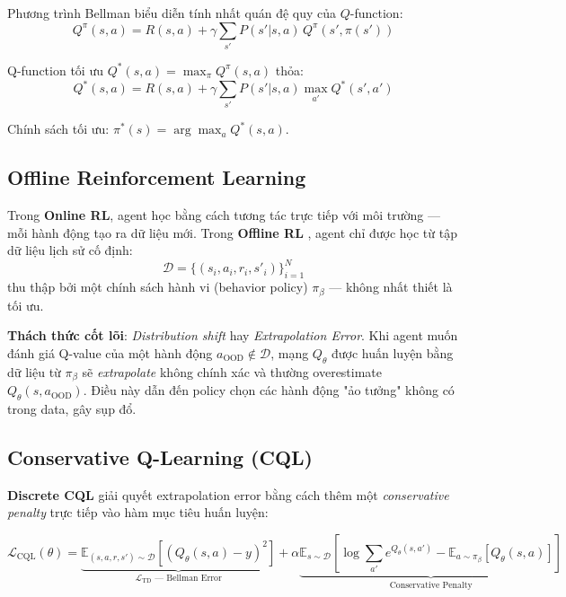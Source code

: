 Phương trình Bellman biểu diễn tính nhất quán đệ quy của $Q$-function:
\begin{equation}
    Q^\pi(s, a) = R(s, a) + \gamma \sum_{s'} P(s'|s,a)\, Q^\pi(s', \pi(s'))
    \label{eq:bellman}
\end{equation}

Q-function tối ưu $Q^*(s,a) = \max_\pi Q^\pi(s,a)$ thỏa:
\begin{equation}
    Q^*(s, a) = R(s, a) + \gamma \sum_{s'} P(s'|s,a) \max_{a'} Q^*(s', a')
\end{equation}

Chính sách tối ưu: $\pi^*(s) = \arg\max_a Q^*(s, a)$.

\subsection{Offline Reinforcement Learning}

Trong \textbf{Online RL}, agent học bằng cách tương tác trực tiếp với môi trường — mỗi hành động tạo ra dữ liệu mới. Trong \textbf{Offline RL} \cite{levine2020offline}, agent chỉ được học từ tập dữ liệu lịch sử cố định:
\begin{equation}
    \mathcal{D} = \{(s_i, a_i, r_i, s'_i)\}_{i=1}^{N}
\end{equation}
thu thập bởi một chính sách hành vi (behavior policy) $\pi_\beta$ — không nhất thiết là tối ưu.

\textbf{Thách thức cốt lõi}: \textit{Distribution shift} hay \textit{Extrapolation Error}. Khi agent muốn đánh giá Q-value của một hành động $a_{\text{OOD}} \notin \mathcal{D}$, mạng $Q_\theta$ được huấn luyện bằng dữ liệu từ $\pi_\beta$ sẽ \textit{extrapolate} không chính xác và thường overestimate $Q_\theta(s, a_{\text{OOD}})$. Điều này dẫn đến policy chọn các hành động "ảo tưởng" không có trong data, gây sụp đổ.

\subsection{Conservative Q-Learning (CQL)}

\textbf{Discrete CQL} \cite{kumar2020conservative} giải quyết extrapolation error bằng cách thêm một \textit{conservative penalty} trực tiếp vào hàm mục tiêu huấn luyện:

\begin{equation}
    \mathcal{L}_{\text{CQL}}(\theta) = \underbrace{\mathbb{E}_{(s,a,r,s')\sim\mathcal{D}}\left[(Q_\theta(s,a) - y)^2\right]}_{\mathcal{L}_\text{TD} \text{ — Bellman Error}} 
    + \alpha \underbrace{\mathbb{E}_{s\sim\mathcal{D}}\left[\log\sum_{a'} e^{Q_\theta(s,a')} - \mathbb{E}_{a\sim\pi_\beta}[Q_\theta(s,a)]\right]}_{\text{Conservative Penalty}}
    \label{eq:cql}
\end{equation}

